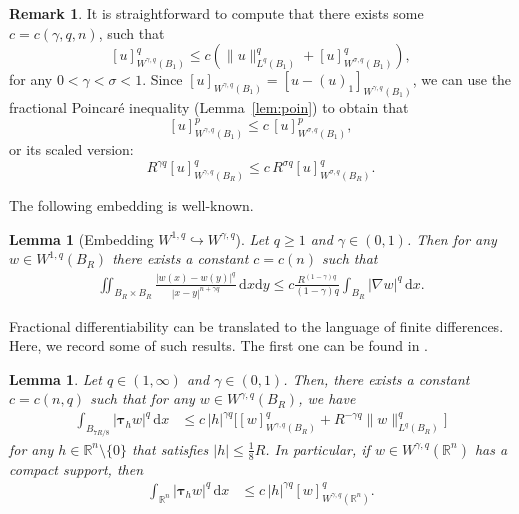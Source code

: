 \documentclass[10pt,letterpaper]{amsart}
\newtheorem{lemma}[theorem]{Lemma}
\theoremstyle{definition}
\newtheorem{remark}[theorem]{Remark}
\numberwithin{theorem}{section}
\numberwithin{equation}{section}
\newcommand{\R}{\ensuremath{\mathbb{R}}}
\newcommand{\1}{\ensuremath{\mathds{1}}}
\newcommand{\dx}{\mathrm{d}x}
\newcommand{\dy}{\mathrm{d}y}
\numberwithin{equation}{section}
\begin{document}
\begin{remark}
It is straightforward to compute that there exists some $c=c(\gamma,q,n)$, such that
$$
[u]_{W^{\gamma,q}(B_1)}^q \leq c  \left( \|u\|_{L^q(B_1)}^q + [u]_{W^{\sigma,q}(B_1)}^q \right),
$$
for any $0<\gamma<\sigma<1$.
Since $[u]_{W^{\gamma,q}(B_1)} = [u - (u)_{1}]_{W^{\gamma,q}(B_1)}$, we can use the fractional Poincar\'e inequality (Lemma~\ref{lem:poin}) to obtain that 
$$
[u]_{W^{\gamma,q}(B_1)}^p \leq c\,   [u]_{W^{\sigma,q}(B_1)}^p,
$$ or its scaled version:
\begin{equation} \label{eq:fract-embedding-s-sigma}
R^{\gamma q} [u]_{W^{\gamma,q}(B_R)}^q \leq c\, R^{\sigma q}  [u]_{W^{\sigma,q}(B_R)}^q.
\end{equation}
\end{remark}


The following embedding is well-known.

\begin{lemma}[Embedding $W^{1,q}\hookrightarrow W^{\gamma,q}$]
\label{lem:FS-S}
Let $q\ge 1$ and $\gamma\in (0,1)$. Then  for any  $w\in W^{1,q}(B_R)$ there exists a constant $c = c(n)$ such that
\begin{align*}
    \iint_{B_R\times B_R} 
    \frac{|w(x)-w(y)|^q}{|x-y|^{n+\gamma q}} \,\dx\dy
    \le 
    c \frac{R^{(1-\gamma)q}}{(1-\gamma)q} 
    \int_{B_R} |\nabla w|^q \,\dx. 
\end{align*}
\end{lemma}

Fractional differentiability can be translated to the language of finite differences. Here, we record some of such results. The first one can be found in \cite[Proposition~2.6]{Brasco-Lindgren}.
\begin{lemma}\label{lem:N-FS}
Let $q\in(1,\infty)$ and $\gamma \in(0,1)$. Then, there exists a constant $c=c(n,q)$ such that for any $w\in W^{\gamma,q}(B_{R})$, we have
\begin{align*}
    \int_{B_{7R/8}} |\boldsymbol{\tau}_h w|^q \,\dx 
    &\le
    c\,|h|^{\gamma q} 
    \Big[[w]^q_{W^{\gamma,q}(B_{R})} +
    R^{-\gamma q}\|w\|^q_{L^q(B_{R})}
    \Big]
\end{align*}
for any  $h\in\R^n\setminus\{0\}$ that satisfies  $|h|\le \frac{1}{8}R$. In particular, if $w\in W^{\gamma,q}(\R^n)$ has a compact support, then
\begin{align*}
    \int_{\R^n} |\boldsymbol{\tau}_h w|^q \,\dx 
    &\le
    c\,|h|^{\gamma q} [w]^q_{W^{\gamma,q}(\R^n)}.
\end{align*}
\end{lemma}
\end{document}
